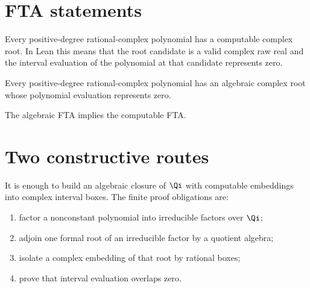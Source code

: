 \section{FTA statements}

\begin{conjecture}\label{conj:computable-fta}
Every positive-degree rational-complex polynomial has a computable complex
root.  In Lean this means that the root candidate is a valid complex raw real
and the interval evaluation of the polynomial at that candidate represents
zero.
\end{conjecture}

\begin{conjecture}\label{conj:algebraic-fta}
Every positive-degree rational-complex polynomial has an algebraic complex
root whose polynomial evaluation represents zero.
\end{conjecture}

\begin{theorem}
\label{thm:computable-fta-of-algebraic-fta}
\leanok
The algebraic FTA implies the computable FTA.
\end{theorem}

\section{Two constructive routes}

\begin{proposition}\label{prop:fta-algebraic-route}
It is enough to build an algebraic closure of \(\Qi\) with computable
embeddings into complex interval boxes.  The finite proof obligations are:
\begin{enumerate}
  \item factor a nonconstant polynomial into irreducible factors over \(\Qi\);
  \item adjoin one formal root of an irreducible factor by a quotient algebra;
  \item isolate a complex embedding of that root by rational boxes;
  \item prove that interval evaluation overlaps zero.
\end{enumerate}
\end{proposition}

